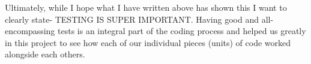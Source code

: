 Ultimately, while I hope what I have written above has shown this I want to clearly state-\/ T\+E\+S\+T\+I\+NG IS S\+U\+P\+ER I\+M\+P\+O\+R\+T\+A\+NT. Having good and all-\/encompassing tests is an integral part of the coding process and helped us greatly in this project to see how each of our individual pieces (units) of code worked alongside each others. 